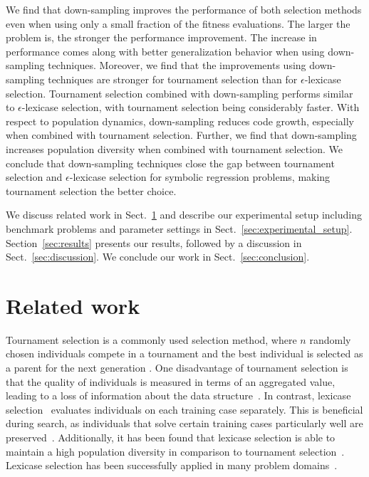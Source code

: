 \documentclass[runningheads]{llncs}
\begin{document}
We find that down-sampling improves the performance of both selection methods even when using only a small fraction of the fitness evaluations. The larger the problem is, the stronger the performance improvement. The increase in performance comes along with  better generalization behavior when using down-sampling techniques. Moreover, we find that the improvements using down-sampling techniques are stronger for tournament selection than for $\epsilon$-lexicase selection. Tournament selection combined with down-sampling performs similar to $\epsilon$-lexicase selection, with tournament selection being considerably faster. 
With respect to population dynamics, down-sampling reduces code growth, especially when combined with tournament selection. Further, we find that down-sampling increases population diversity when combined with tournament selection. We conclude that down-sampling techniques close the gap between tournament selection and $\epsilon$-lexicase selection for symbolic regression problems, making tournament selection the better choice.  

We discuss related work in Sect.~\ref{sec:related_work} and describe our experimental setup including benchmark problems and parameter settings in Sect.~\ref{sec:experimental_setup}. Section~\ref{sec:results} presents our results, followed by a discussion in Sect.~\ref{sec:discussion}. We conclude our work in Sect.~\ref{sec:conclusion}. 


\section{Related work}
\label{sec:related_work}

Tournament selection is a commonly used selection method, where $n$ randomly chosen individuals compete in a tournament and the best individual is selected as a parent for the next generation \cite{Poli.2008}. One disadvantage of tournament selection is that the quality of individuals is measured in terms of an aggregated value, leading to a loss of information about the data structure~\cite{Krawiec.2014}. In contrast, lexicase selection~\cite{Spector.2012, Helmuth.2014} evaluates individuals on each training case separately. This is beneficial during search, as individuals that solve certain training cases particularly well are preserved~\cite{Helmuth.2019, Helmuth.2020b, Pantridge.2018}. Additionally, it has been found that lexicase selection is able to maintain a high population diversity in comparison to tournament selection~\cite{Helmuth.2016}. Lexicase selection has been successfully applied in many problem domains~\cite{Helmuth.2014, Helmuth.2015, Sobania.2023, sobania2021generalizabilitymeasure, Aenugu.2019, Moore.2017, Moore.2018, ding2021optimizing}. 
\end{document}

